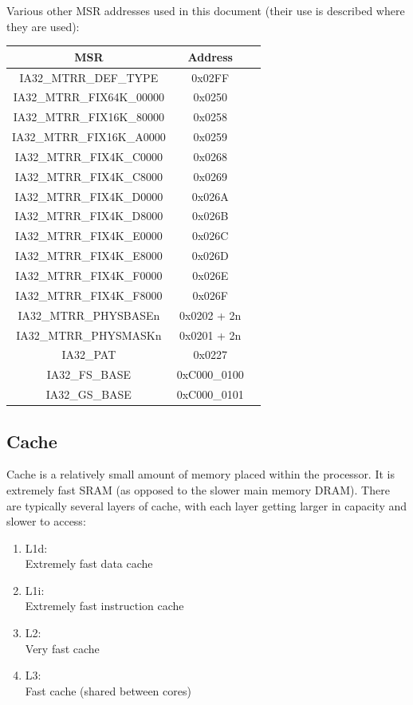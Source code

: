 \documentclass{article}
\newcommand{\layout}[1]{\parbox{\linewidth}{#1}}
\begin{document}
\layout{
  Various other MSR addresses used in this document (their use is described where they are used):
  \begin{table}[H]
    \centering
    \begin{tabular}{|c|c|l|}
      \hline \textbf{MSR} & \textbf{Address} \\ \hline
      IA32\_MTRR\_DEF\_TYPE & 0x02FF \\
      IA32\_MTRR\_FIX64K\_00000 & 0x0250 \\
      IA32\_MTRR\_FIX16K\_80000 & 0x0258 \\
      IA32\_MTRR\_FIX16K\_A0000 & 0x0259 \\
      IA32\_MTRR\_FIX4K\_C0000 & 0x0268 \\
      IA32\_MTRR\_FIX4K\_C8000 & 0x0269 \\
      IA32\_MTRR\_FIX4K\_D0000 & 0x026A \\
      IA32\_MTRR\_FIX4K\_D8000 & 0x026B \\
      IA32\_MTRR\_FIX4K\_E0000 & 0x026C \\
      IA32\_MTRR\_FIX4K\_E8000 & 0x026D \\
      IA32\_MTRR\_FIX4K\_F0000 & 0x026E \\
      IA32\_MTRR\_FIX4K\_F8000 & 0x026F \\
      IA32\_MTRR\_PHYSBASEn & 0x0202 + 2n \\
      IA32\_MTRR\_PHYSMASKn & 0x0201 + 2n \\
      IA32\_PAT & 0x0227 \\
      IA32\_FS\_BASE & 0xC000\_0100 \\
      IA32\_GS\_BASE & 0xC000\_0101 \\
      \hline
    \end{tabular}
  \end{table}

  \cite{sdm4}
}

\layout{
  \subsection{Cache}

  Cache is a relatively small amount of memory placed within the processor. It is extremely fast SRAM (as opposed to the slower main memory DRAM). There are typically several layers of cache, with each layer getting larger in capacity and slower to access:

  \begin{enumerate}
    \item L1d: \\
      Extremely fast data cache
    \item L1i: \\
      Extremely fast instruction cache
    \item L2: \\
      Very fast cache
    \item L3: \\
      Fast cache (shared between cores)
  \end{enumerate}
}
\end{document}
